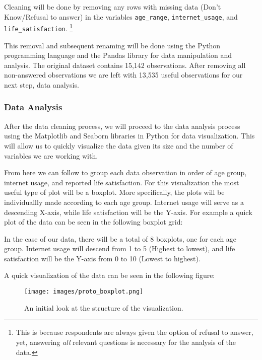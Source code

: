 \documentclass[12pt, a4paper]{article}
\begin{document}
\normalsize \bigskip

\par Cleaning will be done by removing any rows with missing data \footnotesize(Don't Know/Refusal to answer) \normalsize in the variables \texttt{age\_range}, \texttt{internet\_usage}, and \texttt{life\_satisfaction}.
\footnote{This is because respondents are always given the option of refusal to answer, yet, answering \textit{all} relevant questions is necessary for the analysis of the data.}
\par This removal and subsequent renaming will be done using the Python programming language and the Pandas library for data manipulation and analysis.
The original dataset contains 15,142 observations. After removing all non-answered observations we are left with 13,535 useful observations for our next step, data analysis.

\subsubsection{Data Analysis}
\par After the data cleaning process, we will proceed to the data analysis process using the Matplotlib and Seaborn libraries in Python for data visualization.
This will allow us to quickly visualize the data given its size and the number of variables we are working with.
\par From here we can follow to group each data observation in order of age group, internet usage, and reported life satisfaction.
For this visualization the most useful type of plot will be a boxplot.
More specifically, the plots will be individuallly made according to each age group.
Internet usage will serve as a descending X-axis, while life satisfaction will be the Y-axis.
For example a quick plot of the data can be seen in the following boxplot grid:
\par In the case of our data, there will be a total of 8 boxplots, one for each age group.
Internet usage will descend from 1 to 5 {\footnotesize(Highest to lowest)},
and life satisfaction will be the Y-axis from 0 to 10 {\footnotesize(Lowest to highest)}.
\par A quick visualization of the data can be seen in the following figure:

\begin{figure}[!h]
    \centering
    \texttt{[image: images/proto\_boxplot.png]}
    \caption{An initial look at the structure of the visualization.}
\end{figure}
\end{document}
